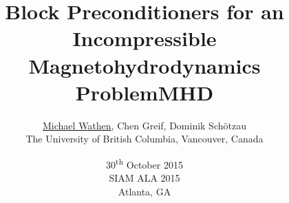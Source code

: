 \documentclass[12pt]{beamer}
\author[]{%
  \underline{Michael Wathen}, Chen Greif, Dominik Sch\"{o}tzau \\
  The University of British Columbia, Vancouver, Canada
  }
\title[]{Block Preconditioners for an Incompressible Magnetohydrodynamics Problem}
\date[]{30\textsuperscript{th} October 2015 \\ SIAM ALA 2015 \\ Atlanta, GA
}
\begin{document}
\begin{frame}
  \titlepage
\end{frame}



\title{MHD}







\end{document}
